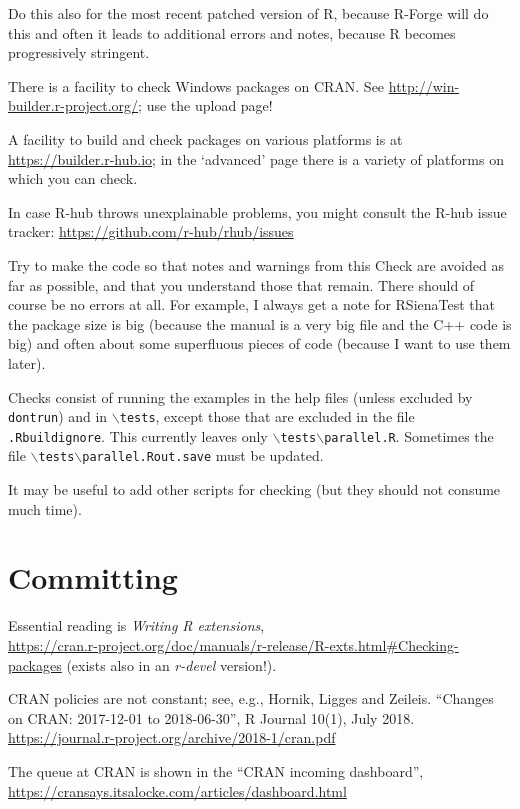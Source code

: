 \documentclass[12pt, a4paper]{article}
\renewcommand{\=}{\,=\,}
\newcommand{\+}{\,+\,}
\newcommand{\bs}{\backslash}
\newcommand{\RST}{{\sf RSienaTest }}
\begin{document}
  Do this also for the most recent patched version of R, because R-Forge will do this
  and often it leads to additional errors and notes, because R becomes progressively
  stringent.


There is a facility to check Windows packages on CRAN. See
\url{http://win-builder.r-project.org/}; use the upload page!

A facility to build and check packages on various platforms
is at \url{https://builder.r-hub.io}; in the `advanced' page
there is a variety of platforms on which you can check.

In case R-hub throws unexplainable problems, you might consult
the R-hub issue tracker:
\url{https://github.com/r-hub/rhub/issues}


  Try to make the code so that notes and warnings from this Check are avoided as far as possible,
  and that you understand those that remain.
  There should of course be no errors at all.
  For example, I always get a note for \RST that the package size is big
  (because the manual is a very big file and the C++ code is big) and
  often about some superfluous pieces of code (because I want to use them later).

  Checks consist of running the examples in the help files (unless excluded by \texttt{dontrun})
  and in \texttt{$\bs$tests}, except those that are excluded in the file \texttt{.Rbuildignore}.
  This currently leaves only \texttt{$\bs$tests$\bs$parallel.R}.
  Sometimes the file \texttt{$\bs$tests$\bs$parallel.Rout.save} must be updated.

  It may be useful to add other scripts for checking (but they should not consume much time).

\section{Committing}

Essential reading is \emph{Writing R extensions},\\
\url{https://cran.r-project.org/doc/manuals/r-release/R-exts.html#Checking-packages}
(exists also in an \textit{r-devel} version!).

CRAN policies are not constant; see, e.g., Hornik, Ligges and Zeileis. 
``Changes on CRAN: 2017-12-01 to 2018-06-30'', 
R Journal 10(1), July 2018. \url{https://journal.r-project.org/archive/2018-1/cran.pdf}
\medskip

The queue at CRAN is shown in the ``CRAN incoming dashboard'', 
          \url{https://cransays.itsalocke.com/articles/dashboard.html}
\end{document}
